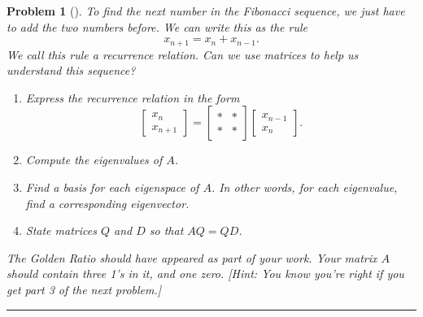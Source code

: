 \documentclass[letterpaper,oneside]{book}%
\theoremstyle{plain}
\theoremstyle{box}
\theoremstyle{problem}
\newtheorem{problemnum}{Problem}[chapter]
\newenvironment{problem}[1][]{\begin{problemnum}[#1]}{\end{problemnum}\nopagebreak\hrule\bigskip}
\newcommand{\bvec}[1]{\begin{bmatrix} #1 \end{bmatrix}}
\begin{document}
\begin{problem}\label{set up the Fibonacci problem}
 To find the next number in the Fibonacci sequence, we just have to add the two numbers before. We can write this as the rule $$x_{n+1}=x_n+x_{n-1}.$$ We call this rule a recurrence relation.
 Can we use matrices to help us understand this sequence? 
 \begin{enumerate}
  \item Express the recurrence relation in the form
  $$\bvec{x_{n}\\x_{n+1}}=\bvec{*&*\\ *&*}\bvec{x_{n-1}\\x_{n}}.$$
  \item Compute the eigenvalues of $A$.
  \item Find a basis for each eigenspace of $A$. In other words, for each eigenvalue, find a corresponding eigenvector. 
  \item State matrices $Q$ and $D$ so that $AQ=QD$. 
 \end{enumerate}
The Golden Ratio should have appeared as part of your work. Your matrix $A$ should contain three 1's in it, and one zero. [Hint: You know you're right if you get part 3 of the next problem.]
\end{problem}
\end{document}
